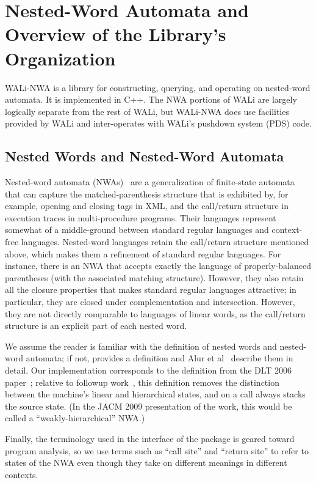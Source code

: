 \section{Nested-Word Automata and Overview of the Library's Organization}
\label{Se:Nested Word Automata}

WALi-NWA is a library for constructing, querying, and operating on
nested-word automata.  It is implemented in C++.  The NWA portions of WALi
are largely logically separate from the rest of WALi, but WALi-NWA does use
facilities provided by WALi and inter-operates with WALi's pushdown system
(PDS) code.

\subsection{Nested Words and Nested-Word Automata}

Nested-word automata (NWAs)~\cite{DLT:AM2006,JACM:AM09} are a generalization
of finite-state automata that can capture the matched-parenthesis structure
that is exhibited by, for example, opening and closing tags in XML, and the
call/return structure in execution traces in multi-procedure
programs. Their languages represent somewhat of a middle-ground between
standard regular languages and context-free languages. Nested-word languages
retain the call/return structure mentioned above, which makes them a
refinement of standard regular languages. For instance, there is an NWA that
accepts exactly the language of properly-balanced parentheses (with the
associated matching structure). However, they also retain all the closure
properties that makes standard regular languages attractive; in particular,
they are closed under complementation and intersection. However, they are not
directly comparable to languages of linear words, as the call/return
structure is an explicit part of each nested word.

We assume the reader is familiar with the definition of nested words and
nested-word automata; if not,  provides a definition and
Alur et al~\cite{DLT:AM2006,JACM:AM09} describe them in detail. Our
implementation corresponds to the definition from the DLT 2006
paper~\cite{DLT:AM2006}; relative to followup work~\cite{JACM:AM09}, this definition removes
the distinction between the machine's linear and hierarchical states, and on
a call always stacks the source state. (In the JACM 2009 presentation of the
work, this would be called a ``weakly-hierarchical'' NWA.)

Finally, the terminology used in the interface of the package is geared
toward program analysis, so we use terms such as ``call site'' and ``return
site'' to refer to states of the NWA even though they take on different
meanings in different contexts.



